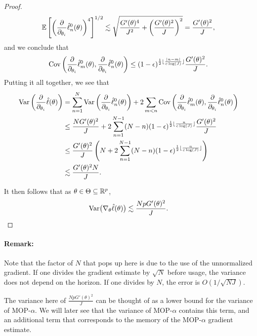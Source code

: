 \begin{proof}
\begin{equation}
\mathbb{E}\left[\left(\frac{\partial}{\partial_{\theta_i}}\hat\ell_n^0(\theta)\right)^4\right]^{1/2} \lesssim  \sqrt{\frac{G'(\theta)^4}{J^2}+\left(\frac{G'(\theta)^2}{J}\right)^2} = \frac{G'(\theta)^2}{J},
\end{equation}
and we conclude that 
\begin{equation}
\mathrm{Cov}\left(\frac{\partial}{\partial_{\theta_i}}\hat\ell_m^0(\theta), \frac{\partial}{\partial_{\theta_i}}\hat\ell_n^0(\theta)\right) \leq (1-\epsilon)^{\frac{1}{2}\lfloor \frac{|n-m|}{c\log(J)} \rfloor}\frac{G'(\theta)^2}{J}.
\end{equation}
Putting it all together, we see that
\begin{align}
    \mathrm{Var}\left(\frac{\partial}{\partial_{\theta_i}} \hat\ell(\theta)\right) &= \sum_{n=1}^N \mathrm{Var}\left(\frac{\partial}{\partial_{\theta_i}}\hat\ell_n^0(\theta)\right) + 2\sum_{m<n} \mathrm{Cov}\left(\frac{\partial}{\partial_{\theta_i}}\hat\ell_m^0(\theta),\frac{\partial}{\partial_{\theta_i}}\hat\ell_n^0(\theta)\right)\\
    &\leq \frac{NG'(\theta)^2}{J} + 2\sum_{n=1}^{N-1} (N-n)(1-\epsilon)^{\frac{1}{2}\lfloor \frac{n}{c\log(J)} \rfloor}\frac{G'(\theta)^2}{J} \\
    &\leq \frac{G'(\theta)^2}{J} \left(N + 2\sum_{n=1}^{N-1} (N-n) (1-\epsilon)^{\frac{1}{2}\lfloor \frac{n}{c\log(J)} \rfloor}\right) \\
    &\lesssim \frac{G'(\theta)^2N}{J}.
\end{align}

It then follows that as $\theta \in \Theta \subseteq \mathbb{R}^p$, 
\begin{equation}
    \mathrm{Var}\big(\nabla_{\theta} \hat\ell(\theta)\big) \lesssim \frac{NpG'(\theta)^2}{J}.
\end{equation}
\end{proof}


\paragraph{Remark:} Note that the factor of $N$ that pops up here is due to the use of the unnormalized gradient. If one divides the gradient estimate by $\sqrt{N}$ before usage, the variance does not depend on the horizon. If one divides by $N$, the error is $O(1/\sqrt{NJ})$.

The variance here of $\frac{NpG'(\theta)^2}{J}$ can be thought of as a lower bound for the variance of MOP-$\alpha$. We will later see that the variance of MOP-$\alpha$ contains this term, and an additional term that corresponds to the memory of the MOP-$\alpha$ gradient estimate.

